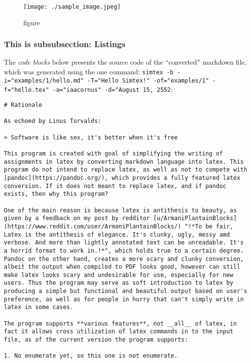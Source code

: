 \documentclass[12pt, UTF8]{article}
\begin{document}
	\begin{figure}[h]
		\texttt{[image: ./sample\_image.jpeg]}
		\caption{figure}
	\end{figure}
	
	\subsubsection{This is subsubsection: Listings}
	
	The \emph{code blocks} below presents the source code of the ``converted'' markdown file, which was generated using the one command: \texttt{simtex -b -i="examples/1/hello.md" -T="Hello Simtex!" -of="examples/1" -f="hello.tex" -a="iaacornus" -d="August 15, 2552}:
	
\begin{lstlisting}
# Rationale

As echoed by Linus Torvalds:

> Software is like sex, it's better when it's free

This program is created with goal of simplifying the writing of assignments in latex by converting markdown language into latex. This program do not intend to replace latex, as well as not to compete with [pandoc](https://pandoc.org/), which provides a fully featured latex conversion. If it does not meant to replace latex, and if pandoc exists, then why this program?

One of the main reason is because latex is antithesis to beauty, as given by a feedback on my post by redditor [u/ArmaniPlantainBlocks](https://www.reddit.com/user/ArmaniPlantainBlocks/) "!*To be fair, Latex is the antithesis of elegance. It's clunky, ugly, messy amd verbose. And more than lightly annotated text can be unreadable. It's a horrid format to work in.!*", which holds true to a certain degree. Pandoc on the other hand, creates a more scary and clunky conversion, albeit the output when compiled to PDF looks good, however can still make latex looks scary and undesirable for use, especially for new users. Thus the program may serve as soft introduction to latex by producing a simple but functional and beautiful output based on user's preference, as well as for people in hurry that can't simply write in latex in some cases.

The program supports **various features**, not __all__ of latex, in fact it allows cross utilization of latex commands in to the input file, as of the current version the program supports:

1. No enumerate yet, so this one is not enumerate.


\end{lstlisting}
\end{document}
